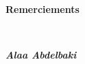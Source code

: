 \begin{center}
    \begin{huge}
        \textbf{Remerciements}
    \end{huge}
\end{center}
\vspace{2cm}
\begin{small}
    \lipsum[2-4]
\end{small} \\
\bigbreak
\begin{flushright}
    \textbf{\textit{Alaa Abdelbaki}}
\end{flushright}